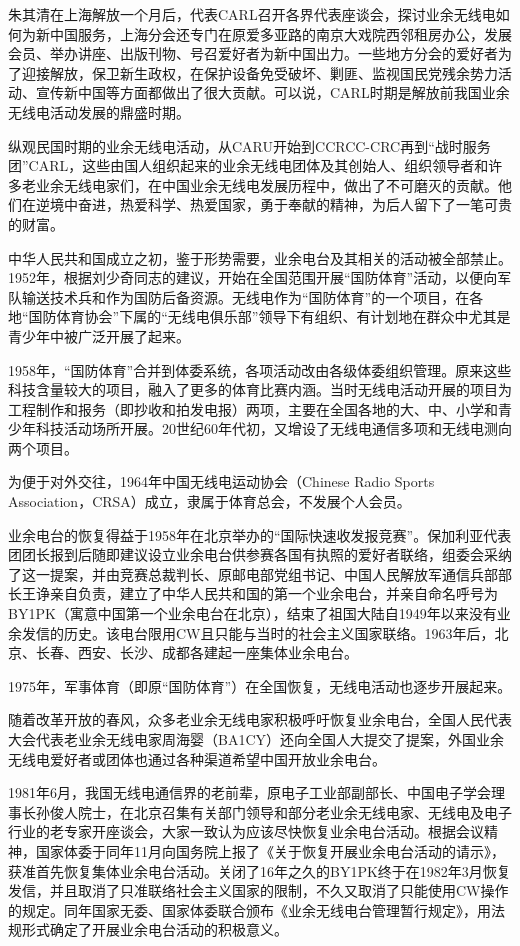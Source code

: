 \documentclass[12pt,UTF8]{ctexbook}
\begin{document}
朱其清在上海解放一个月后，代表CARL召开各界代表座谈会，探讨业余无线电如何为新中国服务，上海分会还专门在原爱多亚路的南京大戏院西邻租房办公，发展会员、举办讲座、出版刊物、号召爱好者为新中国出力。一些地方分会的爱好者为了迎接解放，保卫新生政权，在保护设备免受破坏、剿匪、监视国民党残余势力活动、宣传新中国等方面都做出了很大贡献。可以说，CARL时期是解放前我国业余无线电活动发展的鼎盛时期。

纵观民国时期的业余无线电活动，从CARU开始到CCRCC-CRC再到“战时服务团”CARL，这些由国人组织起来的业余无线电团体及其创始人、组织领导者和许多老业余无线电家们，在中国业余无线电发展历程中，做出了不可磨灭的贡献。他们在逆境中奋进，热爱科学、热爱国家，勇于奉献的精神，为后人留下了一笔可贵的财富。

中华人民共和国成立之初，鉴于形势需要，业余电台及其相关的活动被全部禁止。1952年，根据刘少奇同志的建议，开始在全国范围开展“国防体育”活动，以便向军队输送技术兵和作为国防后备资源。无线电作为“国防体育”的一个项目，在各地“国防体育协会”下属的“无线电俱乐部”领导下有组织、有计划地在群众中尤其是青少年中被广泛开展了起来。

1958年，“国防体育”合并到体委系统，各项活动改由各级体委组织管理。原来这些科技含量较大的项目，融入了更多的体育比赛内涵。当时无线电活动开展的项目为工程制作和报务（即抄收和拍发电报）两项，主要在全国各地的大、中、小学和青少年科技活动场所开展。20世纪60年代初，又增设了无线电通信多项和无线电测向两个项目。

为便于对外交往，1964年中国无线电运动协会（Chinese Radio Sports Association，CRSA）成立，隶属于体育总会，不发展个人会员。

业余电台的恢复得益于1958年在北京举办的“国际快速收发报竞赛”。保加利亚代表团团长报到后随即建议设立业余电台供参赛各国有执照的爱好者联络，组委会采纳了这一提案，并由竞赛总裁判长、原邮电部党组书记、中国人民解放军通信兵部部长王诤亲自负责，建立了中华人民共和国的第一个业余电台，并亲自命名呼号为BY1PK（寓意中国第一个业余电台在北京），结束了祖国大陆自1949年以来没有业余发信的历史。该电台限用CW且只能与当时的社会主义国家联络。1963年后，北京、长春、西安、长沙、成都各建起一座集体业余电台。

1975年，军事体育（即原“国防体育”）在全国恢复，无线电活动也逐步开展起来。

随着改革开放的春风，众多老业余无线电家积极呼吁恢复业余电台，全国人民代表大会代表老业余无线电家周海婴（BA1CY）还向全国人大提交了提案，外国业余无线电爱好者或团体也通过各种渠道希望中国开放业余电台。

1981年6月，我国无线电通信界的老前辈，原电子工业部副部长、中国电子学会理事长孙俊人院士，在北京召集有关部门领导和部分老业余无线电家、无线电及电子行业的老专家开座谈会，大家一致认为应该尽快恢复业余电台活动。根据会议精神，国家体委于同年11月向国务院上报了《关于恢复开展业余电台活动的请示》，获准首先恢复集体业余电台活动。关闭了16年之久的BY1PK终于在1982年3月恢复发信，并且取消了只准联络社会主义国家的限制，不久又取消了只能使用CW操作的规定。同年国家无委、国家体委联合颁布《业余无线电台管理暂行规定》，用法规形式确定了开展业余电台活动的积极意义。
\end{document}
